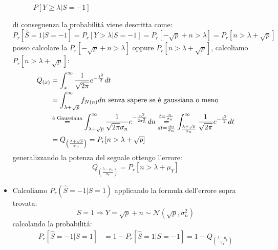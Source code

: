 \begin{itemize}
{\begin{figure}[H]
                        \caption{{\color{red}$P[Y\geq \lambda|S=-1]$}}
                    \end{figure}               
                    di conseguenza la probabilitá viene descritta come:
                    \[
                        P_r[\hat{S} = 1|S=-1] = P_r[Y> \lambda|S=-1] = P_r[-\sqrt{p}+n > \lambda] =P_r[n > \lambda+\sqrt{p}]
                    \]
                    posso calcolare la $P_r[-\sqrt{p}+n > \lambda]$ oppure $P_r[n > \lambda+\sqrt{p}]$, calcoliamo $P_r[n > \lambda+\sqrt{p}]$:
                    \begin{align}
                        Q_{(x)} &= \int_{x}^{\infty} \frac{1}{\sqrt{2\pi}} e^{-\frac{t^2}{2}}dt\nonumber \\
                                &= \int_{\lambda+\sqrt{p}}^{\infty}f_{N(n)}dn\text{ senza sapere se é gaussiana o meno}\nonumber \\
                                &\overset{\text{é Gaussiana}}{=} \int_{\lambda+\sqrt{p}}^{\infty}\frac{1}{\sqrt{2\pi}\sigma_n}e^{-\frac{n^2}{2\sigma_n^2}}dn \overunderset{t = \frac{n}{\sigma_n}}{dt = \frac{dn}{\sigma_n}}{=} \int_{\frac{\lambda+\sqrt{p}}{\sigma_n}}^{\infty}\frac{1}{\sqrt{2\pi}}e^{-\frac{t^2}{2}}dt\nonumber \\
                                &= Q_{\left(\frac{\lambda +\sqrt{p}}{\sigma_n}\right)} = P_r[n>\lambda + \sqrt{p}]\nonumber 
                    \end{align}
                    generalizzando la potenza del segnale ottengo l'errore:
                    \[
                        Q_{\displaystyle\left(\frac{\lambda -\mu_Y}{\sigma_Y}\right)} = P_r[n>\lambda + \mu_Y]
                    \]
                }
                \item {Calcoliamo ${P_r(\hat{S}=-1|S=1)}$ applicando la formula dell'errore sopra trovata:
                    \[
                        S=1\Rightarrow Y = \sqrt{p}+n\sim\mathcal{N}(\sqrt{p},\sigma_n^2)  
                    \]
                    calcolando la probabilitá:
                    \begin{align}
                        P_r[\hat{S}=-1|S=1] &= 1-P_r[\hat{S}=1|S=-1] = 1- Q_{\displaystyle\left(\frac{\lambda -\mu_Y}{\sigma_Y}\right)}  \nonumber \\

\end{align}}
\end{itemize}
